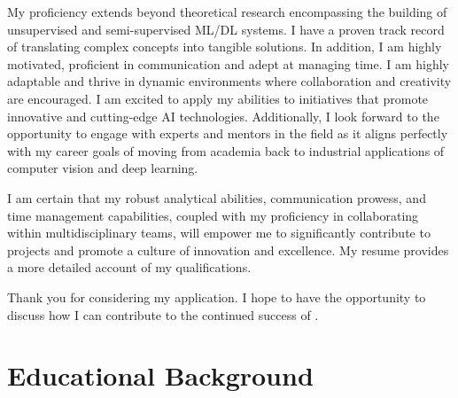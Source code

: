 \documentclass[11pt, a4paper, sans, final]{moderncv}
\begin{document}
My proficiency extends beyond theoretical research encompassing the building of unsupervised and semi-supervised ML/DL systems. I have a proven track record of translating complex concepts into tangible solutions. In addition, I am highly motivated, proficient in communication and adept at managing time. I am highly adaptable and thrive in dynamic environments where collaboration and creativity are encouraged. I am excited to apply my abilities to initiatives that promote innovative and cutting-edge AI technologies. Additionally, I look forward to the opportunity to engage with experts and mentors in the field as it aligns perfectly with my career goals of moving from academia back to industrial applications of computer vision and deep learning.
 
I am certain that my robust analytical abilities, communication prowess, and time management capabilities, coupled with my proficiency in collaborating within multidisciplinary teams, will empower me to significantly contribute to projects and promote a culture of innovation and excellence. My resume provides a more detailed account of my qualifications. 

Thank you for considering my application. I hope to have the opportunity to discuss how I can contribute to the continued success of \companyName.

\makeletterclosing


\newpage
\makecvtitle
\section{Educational Background}
\medskip

\end{document}
